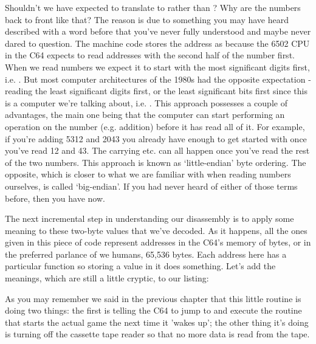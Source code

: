 Shouldn't we have expected  to translate to  rather than 
? Why are the numbers back to front like that? The reason is due to something
you may have heard described with a word before that you've never fully understood and maybe never
dared to question. The machine code
stores the address  as  because the 6502 CPU in the C64 expects to read
addresses with the second half of the number first. When we read numbers we expect it to start
with the most significant digits first, i.e. . But most computer architectures of the 1980s had the opposite
expectation - reading the least significant digits first, or the least significant bits first since
this is a computer we're talking about, i.e. . This approach possesses a couple of advantages,
the main one being that the computer can start performing an operation on the number (e.g. addition) before it
has read all of it. For example, if you're adding 5312 and 2043 you already have enough to get started with once
you've read 12 and 43. The carrying etc. can all happen once you've read the rest of the two numbers. This approach
is known as `little-endian' byte ordering. The opposite, which is closer to what we are familiar with when
reading numbers ourselves, is called `big-endian'. If you had never heard of either of those terms before, then
you have now.

The next incremental step in understanding our disassembly is to apply some meaning to these two-byte values
that we've decoded. As it happens, all the ones given in this piece of code represent addresses in the C64's
memory of  bytes, or in the preferred parlance of we humans, 65,536 bytes. Each address here
has a particular function so storing a value in it does something. Let's add the meanings, which are still
a little cryptic, to our listing:

\begin{minipage}[b]{0.20\linewidth}
\centering

\end{minipage}
\hspace{0.5cm}
\begin{minipage}[b]{0.70\linewidth}
\centering

\end{minipage}

As you may remember we said in the previous chapter that this little routine is doing two things: the first
is telling the C64 to jump to and execute the routine that starts the actual game the next time it 'wakes up'; the
other thing it's doing is turning off the cassette tape reader so that no more data is read from the tape.

